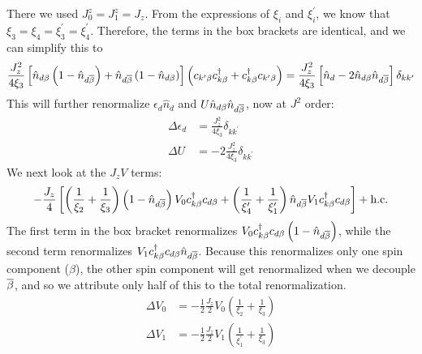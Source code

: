 \documentclass[12pt,twoside]{article}
\numberwithin{equation}{section}
\begin{document}
There we used \(J_0^z = J_1^z = J_z\). From the expressions of \(\xi_i\) and \(\xi_i^\prime\), we know that \(\xi_3 = \xi_4 = \xi_3^\prime = \xi_4^\prime\). Therefore, the terms in the box brackets are identical, and we can simplify this to
\begin{equation}\begin{aligned}
	\frac{J_z^2}{4\xi_3}\left[\hat n_{d\beta}\left( 1 - \hat n_{d\overline\beta} \right) + \hat n_{d\overline\beta}\left( 1 - \hat n_{d\beta} \right) \right]\left(c_{k^\prime\beta}c^\dagger_{k\beta} + c^\dagger_{k\beta}c_{k^\prime\beta}\right) = \frac{J_z^2}{4\xi_3}\left[\hat n_{d} - 2\hat n_{d\beta}\hat n_{d\overline\beta} \right]\delta_{kk^\prime}
\end{aligned}\end{equation}
This will further renormalize \(\epsilon_d \hat n_d\) and \(U\hat n_{d\beta}\hat n_{d\overline\beta}\), now at \(J^2\) order:
\begin{equation}\begin{aligned}
	\label{edU2}
	\Delta \epsilon_d &= \frac{J_z^2}{4\xi_3}\delta_{kk^\prime}\\
	\Delta U &= -2\frac{J_z^2}{4\xi_3}\delta_{kk^\prime}
\end{aligned}\end{equation}
We next look at the \(J_z V\) terms:
\begin{equation}\begin{aligned}
	-\frac{J_z}{4}\left[\left(\frac{1}{\xi_2} + \frac{1}{\xi_3}\right)\left(1 - \hat n_{d\overline\beta}\right)V_0 c^\dagger_{k\beta}c_{d\beta} + \left(\frac{1}{\xi^\prime_4} + \frac{1}{\xi^\prime_1}\right)\hat n_{d\overline\beta} V_1 c^\dagger_{k\beta}c_{d\beta}\right] + \text{h.c.}
\end{aligned}\end{equation}
The first term in the box bracket renormalizes \(V_0 c^\dagger_{k\beta}c_{d\beta}\left(1 - \hat n_{d\overline\beta}\right)\), while the second term renormalizes \(V_1 c^\dagger_{k\beta}c_{d\beta}\hat n_{d\overline\beta}\). Because this renormalizes only one spin component (\(\beta\)), the other spin component will get renormalized when we decouple \(\overline\beta\), and so we attribute only half of this to the total renormalization.
\begin{equation}\begin{aligned}
	\Delta V_0 &= -\frac{1}{2}\frac{J_z}{2}V_0\left(\frac{1}{\xi_2} + \frac{1}{\xi_3}\right)\\
	\Delta V_1 &= -\frac{1}{2}\frac{J_z}{2}V_1\left(\frac{1}{\xi^\prime_1} + \frac{1}{\xi_3}\right)
\end{aligned}\end{equation}
\end{document}
